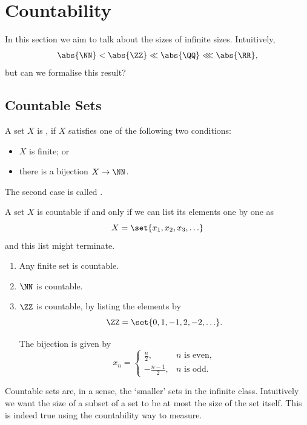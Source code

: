 \section{Countability}
\label{sec:countability}

In this section we aim to talk about the sizes of infinite sizes. Intuitively,
\[
    \abs{\NN} < \abs{\ZZ} \ll \abs{\QQ} \lll \abs{\RR},
\]
but can we formalise this result?

\subsection{Countable Sets}
\label{sec:countable-sets}

\begin{definition}[Countable]
    A set \(X\) is , if \(X\) satisfies one of the following two conditions:
    \begin{itemize}
        \item \(X\) is finite; or
        \item there is a bijection \(X \to \NN\).
    \end{itemize}

    The second case is called .
\end{definition}

A set \(X\) is countable if and only if we can list its elements one by one as
\[
    X = \set{x_1, x_2, x_3, \ldots}
\]
and this list might terminate.

\begin{examples}
    \begin{enumerate}
        \item Any finite set is countable.
        \item \(\NN\) is countable.
        \item \(\ZZ\) is countable, by listing the elements by
        \[
        \ZZ = \set{0, 1, -1, 2, -2, \ldots}.
        \]

        The bijection is given by
        \[
            x_n = \begin{cases}
                \frac{n}{2}, & n \text{ is even}, \\
                - \frac{n - 1}{2}, & n \text{ is odd}.
            \end{cases}
        \]
    \end{enumerate}
\end{examples}

Countable sets are, in a sense, the `smaller' sets in the infinite class. Intuitively we want the size of a subset of a set to be at most the size of the set itself. This is indeed true using the countability way to measure.


